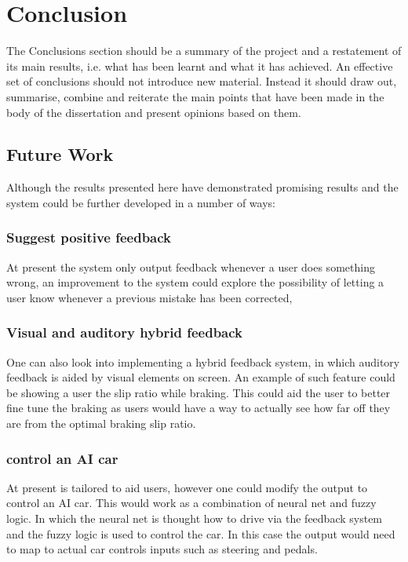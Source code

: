 \chapter{Conclusion}
The Conclusions section should be a summary of the project and a restatement of its main results,
i.e. what has been learnt and what it has achieved. An effective set of conclusions should not
introduce new material. Instead it should draw out, summarise, combine and reiterate the main
points that have been made in the body of the dissertation and present opinions based on them. 

\section{Future Work}

Although the results presented here have demonstrated promising results and the system could be further developed in a number of ways:

\subsection{Suggest positive feedback}
At present the system only output feedback whenever a user does something wrong, an improvement to the system could explore the possibility of letting a user know whenever a previous mistake has been corrected,

\subsection{Visual and auditory hybrid feedback}
One can also look into implementing a hybrid feedback system, in which auditory feedback is aided by visual elements on screen. An example of such feature could be showing a user the slip ratio while braking. This could aid the user to better fine tune the braking as users would have a way to actually see how far off they are from the optimal braking slip ratio.

\subsection{\methodname control an AI car}
At present \methodname is tailored to aid users, however one could modify the output to control an AI car. This would work as a combination of neural net and fuzzy logic. In which the neural net is thought how to drive via the feedback system and the fuzzy logic is used to control the car. In this case the output would need to map to actual car controls inputs such as steering and pedals.

